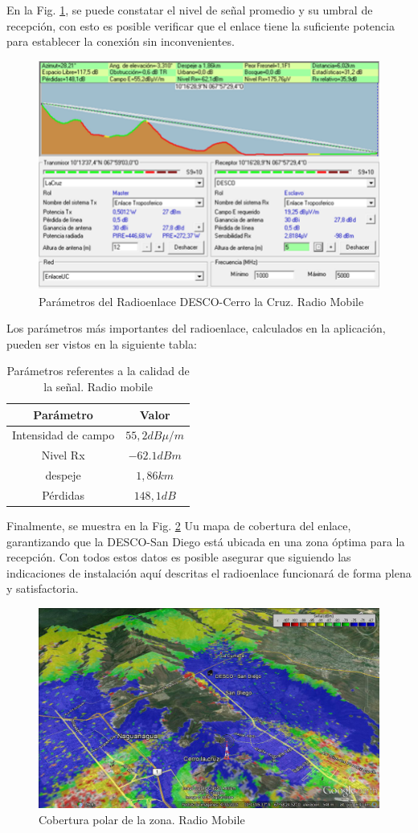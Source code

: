 \documentclass[11pt, a4paper, twosides]{report}
\begin{document}
En la Fig. \ref{fig:rm}, se puede constatar el nivel de señal promedio y su
umbral de recepción, con esto es posible verificar que el enlace tiene la suficiente potencia para establecer la conexión sin inconvenientes.
\newpage

\begin{figure}[h]
    \centering
    \includegraphics[width=0.55\linewidth]{rm.png}
    \caption{Parámetros del Radioenlace DESCO-Cerro la Cruz. Radio Mobile}
    \label{fig:rm}
\end{figure}

Los parámetros más importantes del radioenlace, calculados en la aplicación, pueden ser vistos en la siguiente tabla:

\begin{table}[ht]
\centering
 \begin{tabular}{|c|c|}
	\hline \cellcolor{gray75} Parámetro  & \cellcolor{gray75} Valor \\ 
	\hline Intensidad de campo & $55,2 dB\mu / m$  \\ 
	\hline Nivel Rx & $-62.1 dBm$ \\ 
	\hline despeje & $1,86 km$\\ 
	\hline Pérdidas& $148,1 dB$\\
	\hline 
\end{tabular}
\caption{Parámetros referentes a la calidad de la señal. Radio mobile}
\label{tab:sig}
\end{table}

Finalmente, se muestra en la Fig. \ref{fig:p2} Uu mapa de cobertura del enlace, garantizando que la DESCO-San Diego está ubicada en una zona óptima para la recepción. Con todos estos datos es posible asegurar que siguiendo las indicaciones de instalación aquí descritas el radioenlace funcionará de forma plena y satisfactoria. 

\begin{figure}[h]
    \centering
    \includegraphics[width=0.53\linewidth]{Cobertpolar2.png}
    \caption{Cobertura polar de la zona. Radio Mobile}
    \label{fig:p2}
\end{figure}
\end{document}
